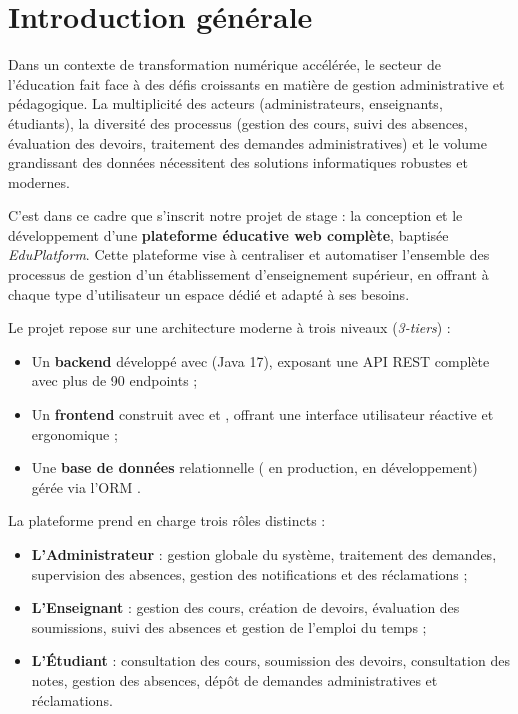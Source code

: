 \chapter*{Introduction générale}

Dans un contexte de transformation numérique accélérée, le secteur de l'éducation fait face à des défis croissants en matière de gestion administrative et pédagogique. La multiplicité des acteurs (administrateurs, enseignants, étudiants), la diversité des processus (gestion des cours, suivi des absences, évaluation des devoirs, traitement des demandes administratives) et le volume grandissant des données nécessitent des solutions informatiques robustes et modernes.

\vspace{0.5cm}

C'est dans ce cadre que s'inscrit notre projet de stage : la conception et le développement d'une \textbf{plateforme éducative web complète}, baptisée \textit{EduPlatform}. Cette plateforme vise à centraliser et automatiser l'ensemble des processus de gestion d'un établissement d'enseignement supérieur, en offrant à chaque type d'utilisateur un espace dédié et adapté à ses besoins.

\vspace{0.5cm}

Le projet repose sur une architecture moderne à trois niveaux (\textit{3-tiers}) :
\begin{itemize}[noitemsep]
    \item Un \textbf{backend} développé avec  (Java 17), exposant une API REST complète avec plus de 90 endpoints ;
    \item Un \textbf{frontend} construit avec  et , offrant une interface utilisateur réactive et ergonomique ;
    \item Une \textbf{base de données} relationnelle ( en production,  en développement) gérée via l'ORM .
\end{itemize}

\vspace{0.5cm}

La plateforme prend en charge trois rôles distincts :
\begin{itemize}[noitemsep]
    \item \textbf{L'Administrateur} : gestion globale du système, traitement des demandes, supervision des absences, gestion des notifications et des réclamations ;
    \item \textbf{L'Enseignant} : gestion des cours, création de devoirs, évaluation des soumissions, suivi des absences et gestion de l'emploi du temps ;
    \item \textbf{L'Étudiant} : consultation des cours, soumission des devoirs, consultation des notes, gestion des absences, dépôt de demandes administratives et réclamations.
\end{itemize}

